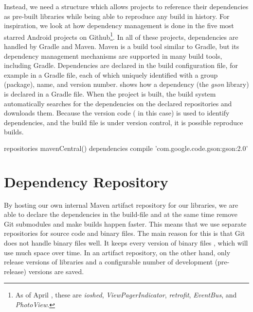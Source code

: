Instead, we need a structure which allows projects to reference their dependencies as pre-built libraries while being able to reproduce any build in history. For inspiration, we look at how dependency management is done in the five most starred Android projects on Github\footnote{As of April , these are \emph{ioshed}, \emph{ViewPagerIndicator}, \emph{retrofit}, \emph{EventBus}, and \emph{PhotoView}.}. In all of these projects, dependencies are handled by Gradle and Maven. Maven is a build tool similar to Gradle, but its dependency management mechanisms are supported in many build tools, including Gradle. Dependencies are declared in the build configuration file, for example in a Gradle file, each of which uniquely identified with a group (package), name, and version number.  shows how a dependency (the \emph{gson} library) is declared in a Gradle file. When the project is built, the build system automatically searches for the dependencies on the declared repositories and downloads them. Because the version code ( in this case) is used to identify dependencies, and the build file is under version control, it is possible reproduce builds.

\begin{gradlecode}[float=tbp,caption={Dependency declaration in Gradle},label={lst:dependency_declaration}]
repositories {
  mavenCentral()
}
dependencies {
  compile 'com.google.code.gson:gson:2.0'
}
\end{gradlecode}

\section{Dependency Repository}\label{sec:dependency_repository}
By hosting our own internal Maven artifact repository for our libraries, we are able to declare the dependencies in the build-file and at the same time remove Git submodules and make builds happen faster. This means that we use separate repositories for source code and binary files. The main reason for this is that Git does not handle binary files well. It keeps every version of binary files \parencite{gitwebsite_attributes}, which will use much space over time. In an artifact repository, on the other hand, only release versions of libraries and a configurable number of development (pre-release) versions are saved.

